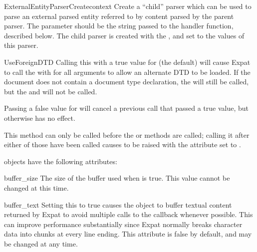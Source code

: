 \begin{methoddesc}[xmlparser]{ExternalEntityParserCreate}{context}
Create a ``child'' parser which can be used to parse an external
parsed entity referred to by content parsed by the parent parser.  The
 parameter should be the string passed to the
 handler function, described below.
The child parser is created with the ,
 and  set to the
values of this parser.
\end{methoddesc}

\begin{methoddesc}[xmlparser]{UseForeignDTD}{}
Calling this with a true value for  (the default) will cause
Expat to call the  with
 for all arguments to allow an alternate DTD to be
loaded.  If the document does not contain a document type declaration,
the  will still be called, but the
 and 
will not be called.

Passing a false value for  will cancel a previous call that
passed a true value, but otherwise has no effect.

This method can only be called before the  or
 methods are called; calling it after either of
those have been called causes  to be raised with
the  attribute set to
.

\end{methoddesc}


 objects have the following attributes:

\begin{memberdesc}[xmlparser]{buffer_size}
The size of the buffer used when  is true.  This
value cannot be changed at this time.
\end{memberdesc}

\begin{memberdesc}[xmlparser]{buffer_text}
Setting this to true causes the  object to buffer
textual content returned by Expat to avoid multiple calls to the
 callback whenever possible.  This can
improve performance substantially since Expat normally breaks
character data into chunks at every line ending.  This attribute is
false by default, and may be changed at any time.
\end{memberdesc}

